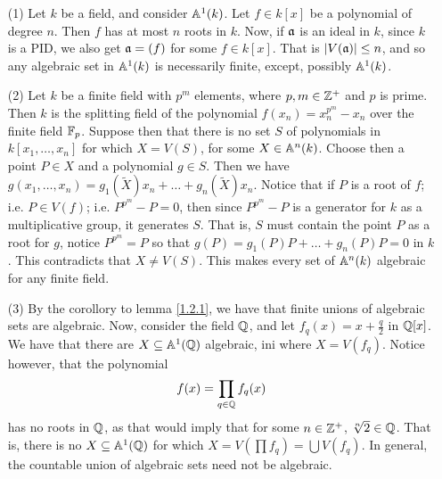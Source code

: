 \begin{example}\label{example_1.5}
    \begin{enumerate}
        \item[(1)] Let $k$ be a field, and consider  $\mathbb{A}^1(k)$. Let $f \in k[x]$
           be a polynomial of degree $n$. Then $f$ has at most $n$ roots in $k$.
           Now, if  $\mathfrak{a}$ is an ideal in $k$, since $k$ is a PID, we also get
           $\mathfrak{a}=(f)$ for some $f \in k[x]$. That is $|V(\mathfrak{a})| \leq n$, and so
           any algebraic set in $\mathbb{A}^1(k)$ is necessarily finite, except,
           possibly $\mathbb{A}^1(k)$.

       \item[(2)] Let $k$ be a finite field with  $p^m$ elements, where  $p,m
           \in \mathbb{Z}^+$ and $p$ is prime. Then $k$ is the splitting field of the
           polynomial $f(x_n)=x_n^{p^m}-x_n$ over the finite field $\mathbb{F}_p$.
           Suppose then that there is no set $S$ of polynomials in $k[x_1,
           \dots, x_n]$ for which $X=V(S)$, for some $X \in \mathbb{A}^n(k)$. Choose
           then a point $P \in X$ and a polynomial $g \in S$. Then we have
           $g(x_1, \dots,x_n)=g_1(\tilde{X})x_n+\dots+g_n(\tilde{X})x_n$. Notice
           that if $P$ is a root of $f$; i.e. $P \in V(f)$; i.e. $P^{p^m}-P=0$,
           then since $P^{p^m}-P$ is a generator for $k$ as a multiplicative
           group, it generates $S$. That is, $S$ must contain the point $P$ as a
           root for $g$, notice  $P^{p^m}=P$ so that
           $g(P)=g_1(P)P+\dots+g_n(P)P=0$ in $k$. This contradicts that $X \neq
           V(S)$. This makes every set of $\mathbb{A}^n(k)$ algebraic for any finite
           field.

       \item[(3)] By the corollory to lemma \ref{1.2.1}, we have that finite
           unions of algebraic sets are algebraic. Now, consider the field $\mathbb{Q}$,
           and let $f_q(x)=x+\frac{q}{2}$ in $\mathbb{Q}[x]$. We have that there are $X
           \subseteq \mathbb{A}^1(\mathbb{Q})$ algebraic, ini where $X=V(f_q)$. Notice however,
           that the polynomial
           \begin{equation*}
               f(x)=\prod_{q \in \mathbb{Q}}{f_q(x)}
           \end{equation*}
           has no roots in $\mathbb{Q}$, as that would imply that for some  $n \in
           \mathbb{Z}^+$,  $\sqrt[n]{2} \in \mathbb{Q}$. That is, there is no $X \subseteq
           \mathbb{A}^1(\mathbb{Q})$ for which $X=V(\prod{f_q})=\bigcup{V(f_q)}$. In general,
           the countable union of algebraic sets need not be algebraic.
    \end{enumerate}
\end{example}

